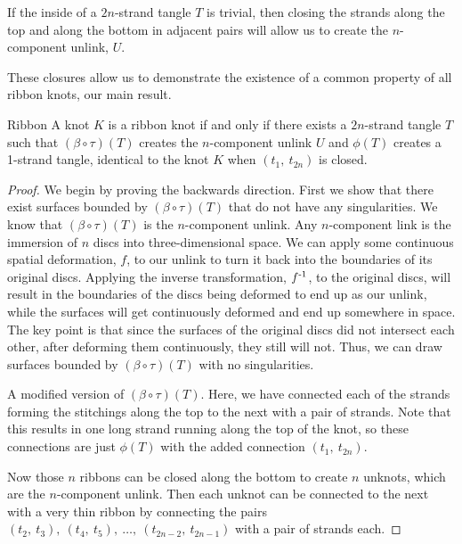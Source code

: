 \begin{paper}
If the inside of a $2n$-strand tangle $T$ is trivial, then closing the strands
along the top and along the bottom in adjacent pairs will allow us to create the
$n$-component unlink, $U$.

\begin{paperwhere}
\end{paperwhere}

These closures allow us to demonstrate the existence of a common property of all
ribbon knots, our main result.

\begin{paperthm}{Ribbon}
A knot $K$ is a ribbon knot if and only if there exists a $2n$-strand tangle $T$
such that $(\beta\circ\tau)(T)$ creates the $n$-component unlink $U$ and
$\phi(T)$ creates a 1-strand tangle, identical to the knot $K$ when
$(t_1,~t_{2n})$ is closed.
\end{paperthm}
\begin{proof}
We begin by proving the backwards direction.
First we show that there exist surfaces bounded by $(\beta\circ\tau)(T)$ that do
not have any singularities.
We know that $(\beta\circ\tau)(T)$ is the $n$-component unlink.
Any $n$-component link is the immersion of $n$ discs into three-dimensional
space.
We can apply some continuous spatial deformation, $f$, to our unlink to turn it
back into the boundaries of its original discs.
Applying the inverse transformation, $f^{\text-1}$, to the original discs, will
result in the boundaries of the discs being deformed to end up as our unlink,
while the surfaces will get continuously deformed and end up somewhere in space.
The key point is that since the surfaces of the original discs did not intersect
each other, after deforming them continuously, they still will not.
Thus, we can draw surfaces bounded by $(\beta\circ\tau)(T)$ with no
singularities.

{A modified version of $(\beta\circ\tau)(T)$.
Here, we have connected each of the strands forming the stitchings along the top
to the next with a pair of strands.
Note that this results in one long strand running along the top of the knot, so
these connections are just $\phi(T)$ with the added connection $(t_1,~t_{2n})$.}

Now those $n$ ribbons can be closed along the bottom to create $n$ unknots,
which are the $n$-component unlink.
Then each unknot can be connected to the next with a very thin ribbon by
connecting the pairs $(t_2,~t_3),~(t_4,~t_5),~\dots,~(t_{2n-2},~t_{2n-1})$ with
a pair of strands each.


\end{proof}
\end{paper}
